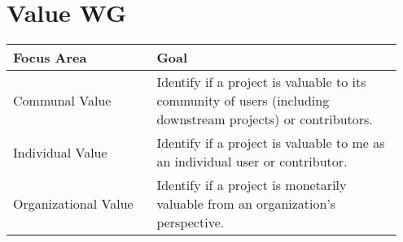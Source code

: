 

\section{Value WG}
\begin{table}[ht!]
    \centering
    \begin{tabular}{|p{0.35\linewidth} | p{0.6\linewidth}|}
        \hline
        \hfil \textbf{Focus Area}  & \hfil \textbf{Goal} \\
        \hline
    		Communal Value & Identify if a project is valuable to its community of users (including downstream projects) or contributors. \\ 
		\hline
		Individual Value & Identify if a project is valuable to me as an individual user or contributor. \\ 
		\hline
		Organizational Value & Identify if a project is monetarily valuable from an organization's perspective. \\ 
		\hline
    \end{tabular}
\end{table}
    
\clearpage
 
 
 

